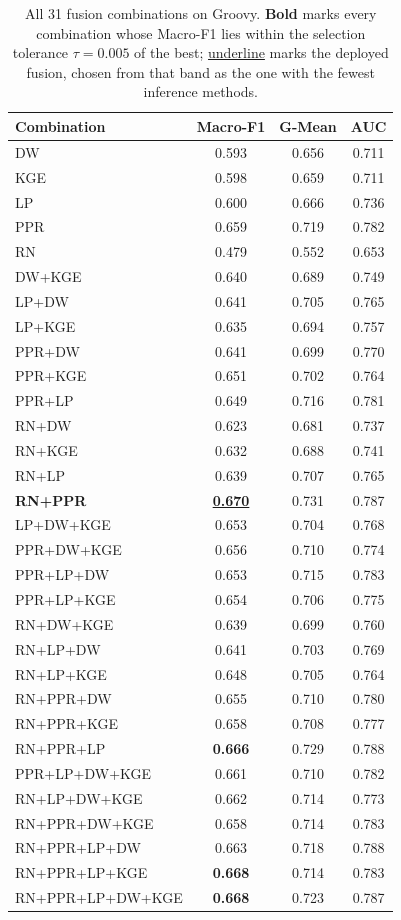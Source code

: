 \documentclass[final,5p,times,twocolumn]{elsarticle}
\theoremstyle{plain}
\begin{document}
\begin{table}[t]\centering\scriptsize\setlength{\tabcolsep}{3pt}
\caption{All 31 fusion combinations on Groovy. \textbf{Bold} marks every combination whose Macro-F1 lies within the selection tolerance $\tau=0.005$ of the best; \underline{underline} marks the deployed fusion, chosen from that band as the one with the fewest inference methods.}
\label{tab:combos_groovy}
\begin{tabular}{lccc}
\toprule
Combination & Macro-F1 & G-Mean & AUC \\ \midrule
DW & 0.593 & 0.656 & 0.711 \\
KGE & 0.598 & 0.659 & 0.711 \\
LP & 0.600 & 0.666 & 0.736 \\
PPR & 0.659 & 0.719 & 0.782 \\
RN & 0.479 & 0.552 & 0.653 \\
DW+KGE & 0.640 & 0.689 & 0.749 \\
LP+DW & 0.641 & 0.705 & 0.765 \\
LP+KGE & 0.635 & 0.694 & 0.757 \\
PPR+DW & 0.641 & 0.699 & 0.770 \\
PPR+KGE & 0.651 & 0.702 & 0.764 \\
PPR+LP & 0.649 & 0.716 & 0.781 \\
RN+DW & 0.623 & 0.681 & 0.737 \\
RN+KGE & 0.632 & 0.688 & 0.741 \\
RN+LP & 0.639 & 0.707 & 0.765 \\
\textbf{RN+PPR} & \underline{\textbf{0.670}} & 0.731 & 0.787 \\
LP+DW+KGE & 0.653 & 0.704 & 0.768 \\
PPR+DW+KGE & 0.656 & 0.710 & 0.774 \\
PPR+LP+DW & 0.653 & 0.715 & 0.783 \\
PPR+LP+KGE & 0.654 & 0.706 & 0.775 \\
RN+DW+KGE & 0.639 & 0.699 & 0.760 \\
RN+LP+DW & 0.641 & 0.703 & 0.769 \\
RN+LP+KGE & 0.648 & 0.705 & 0.764 \\
RN+PPR+DW & 0.655 & 0.710 & 0.780 \\
RN+PPR+KGE & 0.658 & 0.708 & 0.777 \\
RN+PPR+LP & \textbf{0.666} & 0.729 & 0.788 \\
PPR+LP+DW+KGE & 0.661 & 0.710 & 0.782 \\
RN+LP+DW+KGE & 0.662 & 0.714 & 0.773 \\
RN+PPR+DW+KGE & 0.658 & 0.714 & 0.783 \\
RN+PPR+LP+DW & 0.663 & 0.718 & 0.788 \\
RN+PPR+LP+KGE & \textbf{0.668} & 0.714 & 0.783 \\
RN+PPR+LP+DW+KGE & \textbf{0.668} & 0.723 & 0.787 \\
\bottomrule
\end{tabular}
\end{table}
\end{document}
